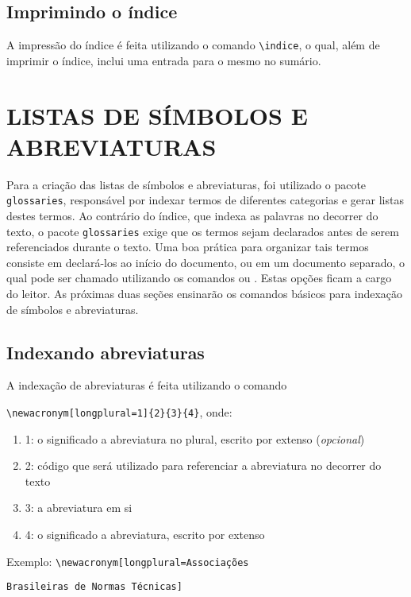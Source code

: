 \documentclass{fei}
\begin{document}
	\section{Imprimindo o índice}

	A impressão do índice é feita utilizando o comando \verb+\indice+, o qual, além de imprimir o índice, inclui uma entrada para o mesmo no sumário.

	\chapter{LISTAS DE SÍMBOLOS E ABREVIATURAS} \label{chap:listas}
	
	Para a criação das listas de símbolos e abreviaturas, foi utilizado o pacote \verb+glossaries+, responsável por indexar termos de diferentes categorias e gerar listas destes termos. Ao contrário do índice, que indexa as palavras no decorrer do texto, o pacote \verb+glossaries+ exige que os termos sejam declarados antes de serem referenciados durante o texto. Uma boa prática para organizar tais termos consiste em declará-los ao início do documento, ou em um documento separado, o qual pode ser chamado utilizando os comandos \verb++ ou \verb++. Estas opções ficam a cargo do leitor. As próximas duas seções ensinarão os comandos básicos para indexação de símbolos e abreviaturas.
	
	\section{Indexando abreviaturas}
	
	A indexação de abreviaturas é feita utilizando o comando
	
	\verb+\newacronym[longplural=1]{2}{3}{4}+, onde:
	
	\begin{enumerate}
	\item 1: o significado a abreviatura no plural, escrito por extenso (\emph{opcional})
	\item 2: código que será utilizado para referenciar a abreviatura no decorrer do texto
	\item 3: a abreviatura em si
	\item 4: o significado a abreviatura, escrito por extenso
	\end{enumerate}
	
	Exemplo: \verb+\newacronym[longplural=Associações+
	
			 \verb+Brasileiras de Normas Técnicas]+
			 
\end{document}
